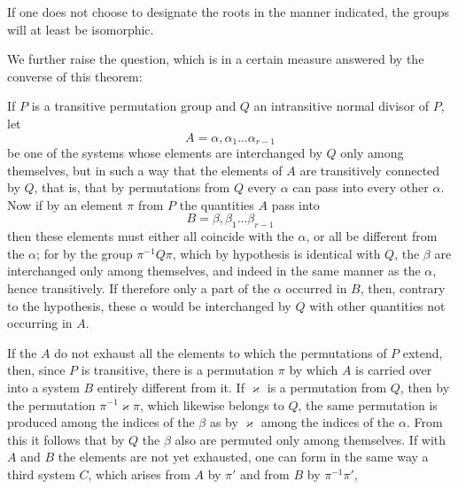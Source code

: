 
If one does not choose to designate the roots in the manner
indicated, the groups will at least be
isomorphic.

We further raise the question, which is in a certain measure
answered by the converse of this theorem: 

If $P$ is a transitive permutation group and $Q$ an intransitive
normal divisor of $P$, let
\[
A = \alpha, \alpha_1 \ldots \alpha_{r-1}
\]
be one of the systems whose elements are interchanged by $Q$ only
among themselves, but in such a way that the elements of $A$
are transitively connected by $Q$, that is, that by permutations
from $Q$ every $\alpha$ can pass into every other $\alpha$. Now if
by an element $\pi$ from $P$ the quantities $A$ pass into
\[
B = \beta, \beta_1 \ldots \beta_{r-1}
\]
then these elements must either all coincide with the $\alpha$,
or all be different from the $\alpha$; for
by the group $\pi^{-1} Q \pi$, which by hypothesis is identical
with $Q$, the $\beta$ are interchanged only among themselves, and indeed
in the same manner as the $\alpha$, hence transitively. If therefore only a part
of the $\alpha$ occurred in $B$, then, contrary to the hypothesis,
these $\alpha$ would be interchanged by $Q$ with other quantities not
occurring in $A$.

If the $A$ do not exhaust all the elements to which
the permutations of $P$ extend, then, since $P$
is transitive, there is a permutation $\pi$ by which $A$ is carried over
into a system $B$ entirely different from it. If $\varkappa$ is a permutation
from $Q$, then by the permutation $\pi^{-1} \varkappa \pi$, which likewise
belongs to $Q$, the same permutation is produced among the indices of the $\beta$
as by $\varkappa$ among the indices of the $\alpha$. From this
it follows that by $Q$ the $\beta$ also are permuted only
among themselves. If with $A$ and $B$ the elements are not yet exhausted,
one can form in the same way a third system $C$,
which arises from $A$ by $\pi'$ and from $B$ by $\pi^{-1}\pi'$,
